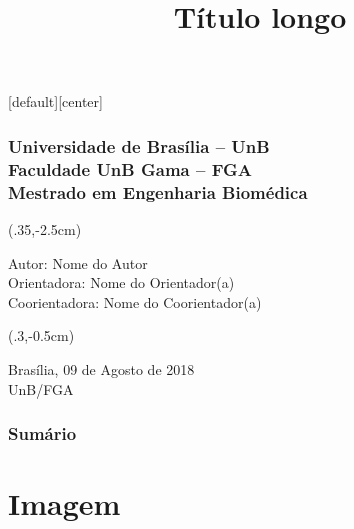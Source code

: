 \documentclass[aspectratio=169]{beamer}
\begin{document}
	\title[Título Curto]{Título longo}
	\author[e-mail@e-mail.com]{}
	\date[]{}%
	
	[default][center]
	
	\begin{frame}
	
		\frametitle{\tiny  \textbf{Universidade de Brasília – UnB\\Faculdade UnB Gama – FGA\\ \vspace{0.8mm} Mestrado em Engenharia Biomédica\\ \qquad}}
		\titlepage
		
		\begin{textblock*}{100mm}(.35\textwidth,-2.5cm)
			\begin{flushright}
				\footnotesize
				Autor: Nome do Autor\\
				Orientadora: Nome do Orientador(a)\\
				Coorientadora: Nome do Coorientador(a)
			\end{flushright}
		\end{textblock*}

		\begin{textblock*}{50mm}(.3\textwidth,-0.5cm)
			\begin{center}
				\footnotesize
				Brasília, 09 de Agosto de 2018\\
				UnB/FGA
			\end{center}
		\end{textblock*}

	\end{frame}
	
	\begin{frame}
		\frametitle{Sum\'{a}rio}
		\tableofcontents%
	\end{frame}
	
	\section{Imagem}
\end{document}
